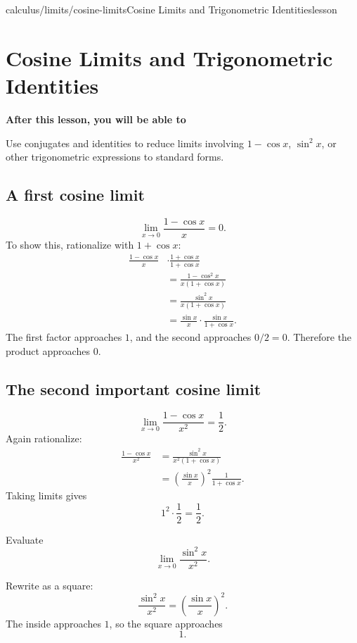 \documentclass[11pt,openany]{book}
\theoremstyle{bgplain}
\newcommand{\lessonobjective}[1]{%
  \par\Needspace{4\baselineskip}\addvspace{0.6em}%
  {\bfseries\color{BGInk}After this lesson, you will be able to}\par\smallskip
  #1\par\addvspace{0.5em}%
}
\begin{document}
\begin{webpage}{calculus/limits/cosine-limits}{Cosine Limits and Trigonometric Identities}{lesson}
\section{Cosine Limits and Trigonometric Identities}

\lessonobjective{
Use conjugates and identities to reduce limits involving \(1-\cos x\), \(\sin^2x\), or other trigonometric expressions to standard forms.
}

\subsection{A first cosine limit}

\[
  \boxed{\lim_{x\to0}\frac{1-\cos x}{x}=0}.
\]
To show this, rationalize with \(1+\cos x\):
\begin{align*}
\frac{1-\cos x}{x}
&\cdot\frac{1+\cos x}{1+\cos x}\\
&=\frac{1-\cos^2x}{x(1+\cos x)}\\
&=\frac{\sin^2x}{x(1+\cos x)}\\
&=\frac{\sin x}{x}\cdot\frac{\sin x}{1+\cos x}.
\end{align*}
The first factor approaches \(1\), and the second approaches \(0/2=0\). Therefore the product approaches \(0\).

\subsection{The second important cosine limit}

\[
  \boxed{\lim_{x\to0}\frac{1-\cos x}{x^2}=\frac12}.
\]
Again rationalize:
\begin{align*}
\frac{1-\cos x}{x^2}
&=\frac{\sin^2x}{x^2(1+\cos x)}\\
&=\left(\frac{\sin x}{x}\right)^2\frac1{1+\cos x}.
\end{align*}
Taking limits gives
\[
  1^2\cdot\frac12=\frac12.
\]

\begin{bgguided}[title={Recognize the squared pattern}]
Evaluate
\[
  \lim_{x\to0}\frac{\sin^2x}{x^2}.
\]

\begin{bgsolution}
Rewrite as a square:
\[
  \frac{\sin^2x}{x^2}
  =\left(\frac{\sin x}{x}\right)^2.
\]
The inside approaches \(1\), so the square approaches
\[
  \boxed{1}.
\]
\end{bgsolution}
\end{bgguided}


\end{webpage}
\end{document}
